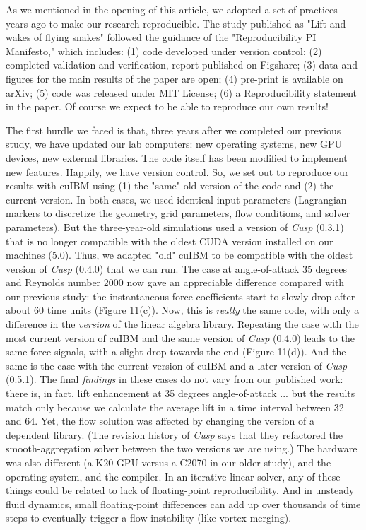 \documentclass[9pt,twocolumn,twoside]{article}
\newlength{\up}
\begin{document}
As we mentioned in the opening of this article, we adopted a set of practices years ago to make our research reproducible. 
The study published as "Lift and wakes of flying snakes" followed the guidance of the "Reproducibility PI Manifesto," 
which includes: 
(1) code developed under version control; 
(2) completed validation and verification, report published on Figshare; 
(3) data and figures for the main results of the paper are open; 
(4) pre-print is available on arXiv; 
(5) code was released under MIT License; 
(6) a Reproducibility statement in the paper.
Of course we expect to be able to reproduce our own results!

The first hurdle we faced is that, three years after we completed our previous study, we have updated our lab computers: 
new operating systems, new GPU devices, new external libraries. 
The code itself has been modified to implement new features. 
Happily, we have version control.
So, we set out to reproduce our results with cuIBM using (1) the "same"  old version of the code and (2) the current version. 
In both cases, we used identical input parameters (Lagrangian markers to discretize the geometry, grid parameters, flow conditions, and solver parameters). 
But the three-year-old simulations used a version of \textsl{Cusp} (0.3.1) that is no longer compatible with the oldest CUDA version installed on our machines (5.0). 
Thus, we adapted "old" cuIBM to be compatible with the oldest version of \textsl{Cusp} (0.4.0) that we can run. 
The case at angle-of-attack 35 degrees and Reynolds number 2000 now gave an appreciable difference compared with our previous study: 
the instantaneous force coefficients start to slowly drop after about 60 time units (Figure 11(c)). 
Now, this is \textit{really} the same code, with only a difference in the \textit{version} of the linear algebra library. 
Repeating the case with the most current version of cuIBM and the same version of \textsl{Cusp} (0.4.0) leads to the same force signals, with a slight drop towards the end (Figure 11(d)). 
And the same is the case with the current version of cuIBM and a later version of \textsl{Cusp} (0.5.1). 
The final \textit{findings} in these cases do not vary from our published work: there is, in fact, lift enhancement at 35 degrees angle-of-attack ... but the results match only because we calculate the average lift in a time interval between 32 and 64. 
Yet, the flow solution was affected by changing the version of a dependent library. 
(The revision history of \textsl{Cusp} says that they refactored the smooth-aggregation solver between the two versions we are using.) 
The hardware was also different (a K20 GPU versus a C2070 in our older study), and the operating system, and the compiler. 
In an iterative linear solver, any of these things could be related to lack of floating-point reproducibility. 
And in unsteady fluid dynamics, small floating-point differences can add up over thousands of time steps to eventually trigger a flow instability (like vortex merging).
\end{document}
